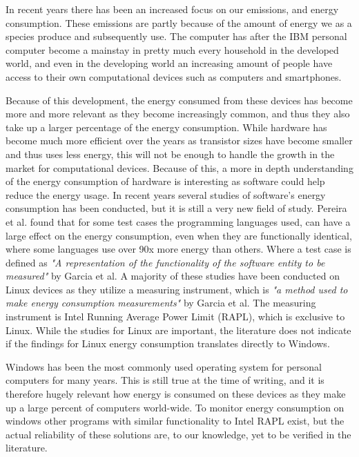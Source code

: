 In recent years there has been an increased focus on our emissions, and energy consumption. These emissions are partly because of the amount of energy we as a species produce and subsequently use. 
The computer has after the IBM personal computer become a mainstay in pretty much every household in the developed world, and even in the developing world an increasing amount of people have access to their own computational devices such as computers and smartphones\cite{DevelopedWorldPC}. 

Because of this development, the energy consumed from these devices has become more and more relevant as they become increasingly common, and thus they also take up a larger percentage of the energy consumption. 
While hardware has become much more efficient over the years as transistor sizes have become smaller and thus uses less energy, this will not be enough to handle the growth in the market for computational devices. Because of this, a more in depth understanding of the energy consumption of hardware is interesting as software could help reduce the energy usage\cite{somavat2011energy}. 
In recent years several studies of software's energy consumption has been conducted, but it is still a very new field of study. Pereira et al.\cite*{Pereira2017} found that for some test cases the programming languages used, can have a large effect on the energy consumption, even when they are functionally identical, where some languages use over 90x more energy than others. Where a test case is defined as \textit{"A representation of the functionality of the software entity to be measured"} by Garcia et al.\cite*{GarciaFEETINGS}
A majority of these studies have been conducted on Linux devices as they utilize a measuring instrument, which is \textit{"a method used to make energy consumption measurements"} by Garcia et al.\cite*{GarciaFEETINGS} The measuring instrument is Intel Running Average Power Limit (RAPL), which is exclusive to Linux. While the studies for Linux are important, the literature does not indicate if the findings for Linux energy consumption translates directly to Windows\cite{Pereira2017}. 

Windows has been the most commonly used operating system for personal computers for many years. This is still true at the time of writing, and it is therefore hugely relevant how energy is consumed on these devices as they make up a large percent of computers world-wide\cite{OSShare}. To monitor energy consumption on windows other programs with similar functionality to Intel RAPL exist, but the actual reliability of these solutions are, to our knowledge, yet to be verified in the literature.

